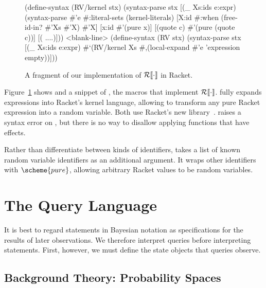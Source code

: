 \begin{figure}[tb]
\begin{schemedisplay}
(define-syntax (RV/kernel stx)
  (syntax-parse stx
    [(_ Xs:ids e:expr)
     (syntax-parse #'e #:literal-sets (kernel-literals)
       [X:id  #:when (free-id-in? #'Xs #'X)  #'X]
       [x:id  #'(pure x)]
       [(quote c)  #'(pure (quote c))]
       [(%
       ....)]))
<blank-line>
(define-syntax (RV stx)
  (syntax-parse stx
    [(_ Xs:ids e:expr)
     #`(RV/kernel Xs #,(local-expand #'e 'expression empty))]))
\end{schemedisplay}
\vspace{-\belowcodeskip}  %
\hrulefill
\caption[Implementation of $\RV{\cdot}$]{A fragment of our implementation of $\RV{\cdot}$ in Racket.}
\label{fig:rv-impl}
\end{figure}

Figure~\ref{fig:rv-impl} shows  and a snippet of , the macros that implement $\RV{\cdot}$.  fully expands expressions into Racket's kernel language, allowing  to transform any pure Racket expression into a random variable. Both use Racket's new  library~\cite{cit:culpepper-2010diss}.  raises a syntax error on , but there is no way to disallow applying functions that have effects.

Rather than differentiate between kinds of identifiers,  takes a list of known random variable identifiers as an additional argument. It wraps other identifiers with $\scheme{pure}$, allowing arbitrary Racket values to be random variables.

\section{The Query Language}
\label{sec:prob-dist}

It is best to regard statements in Bayesian notation as specifications for the results of later observations. We therefore interpret queries before interpreting statements. First, however, we must define the state objects that queries observe.

\subsection{Background Theory: Probability Spaces}

